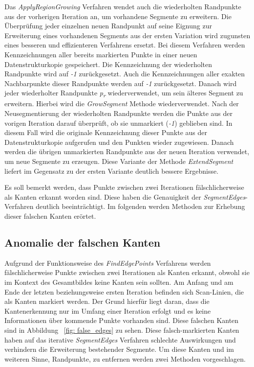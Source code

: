 Das \textit{ApplyRegionGrowing} Verfahren wendet auch die wiederholten Randpunkte aus der vorherigen Iteration an, um vorhandene Segmente zu erweitern. Die Überprüfung jeder einzelnen neuen Randpunkt auf seine Eignung zur Erweiterung eines vorhandenen Segments aus der ersten Variation wird zugunsten eines besseren und effizienteren Verfahrens ersetzt. Bei diesem Verfahren werden Kennzeichnungen aller bereits markierten Punkte in einer neuen Datenstrukturkopie gespeichert. Die Kennzeichnung der wiederholten Randpunkte wird auf \textit{-1} zurückgesetzt. Auch die Kennzeichnungen aller exakten Nachbarpunkte dieser Randpunkte werden auf \textit{-1} zurückgesetzt. Danach wird jeder wiederholter Randpunkte \textit{p\textsubscript{r}} wiederverwendet, um sein älteres Segment zu erweitern. Hierbei wird die \textit{GrowSegment} Methode wiederverwendet. Nach der Neusegmentierung der wiederholten Randpunkte werden die Punkte aus der vorigen Iteration darauf überprüft, ob sie unmarkiert (\textit{-1}) geblieben sind. In diesem Fall wird die originale Kennzeichnung dieser Punkte aus der Datenstrukturkopie aufgerufen und den Punkten wieder zugewiesen. Danach werden die übrigen unmarkierten Randpunkte aus der neuen Iteration verwendet, um neue Segmente zu erzeugen. Diese Variante der Methode \textit{ExtendSegment} liefert im Gegensatz zu der ersten Variante deutlich bessere Ergebnisse.

Es soll bemerkt werden, dass Punkte zwischen zwei Iterationen fälschlicherweise als Kanten erkannt worden sind. Diese haben die Genauigkeit der \textit{SegmentEdges}-Verfahren deutlich beeinträchtigt. Im folgenden werden Methoden zur Erhebung dieser falschen Kanten erörtet.

\subsection{Anomalie der falschen Kanten} \label{false_edges}
Aufgrund der Funktionsweise des \textit{FindEdgePoints} Verfahrens werden fälschlicherweise Punkte zwischen zwei Iterationen als Kanten erkannt, obwohl sie im Kontext des Gesamtbildes keine Kanten sein sollten. Am Anfang und am Ende der letzten beziehungsweise ersten Iteration befinden sich Scan-Linien, die als Kanten markiert werden. Der Grund hierfür liegt daran, dass die Kantenerkennung nur im Umfang einer Iteration erfolgt und es keine Informationen über kommende Punkte vorhanden sind. Diese falschen Kanten sind in Abbildung ~\ref{fig: false_edges} zu sehen. Diese falsch-markierten Kanten haben auf das iterative \textit{SegmentEdges} Verfahren schlechte Auswirkungen und verhindern die Erweiterung bestehender Segmente. Um diese Kanten und im weiteren Sinne, Randpunkte, zu entfernen werden zwei Methoden vorgeschlagen.

